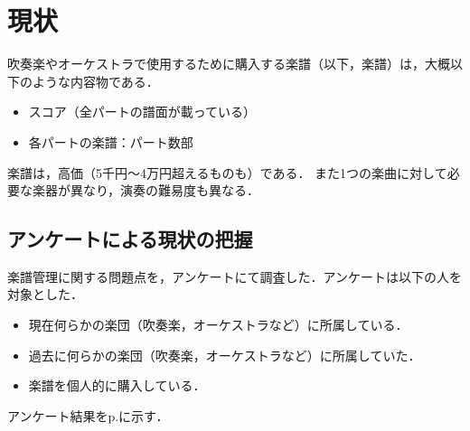 \chapter{現状}
吹奏楽やオーケストラで使用するために購入する楽譜（以下，楽譜）は，大概以下のような内容物である．
\begin{itemize}
    \item スコア（全パートの譜面が載っている）
    \item 各パートの楽譜：パート数部
\end{itemize}
楽譜は，高価（5千円〜4万円超えるものも）である．
また1つの楽曲に対して必要な楽器が異なり，演奏の難易度も異なる．
\section{アンケートによる現状の把握}\label{chap:issues}
楽譜管理に関する問題点を，アンケートにて調査した．アンケートは以下の人を対象とした．
\begin{itemize}
    \item 現在何らかの楽団（吹奏楽，オーケストラなど）に所属している．
    \item 過去に何らかの楽団（吹奏楽，オーケストラなど）に所属していた．
    \item 楽譜を個人的に購入している．
\end{itemize}
アンケート結果をp.\pageref{frame:アンケート}に示す．
\clearpage
